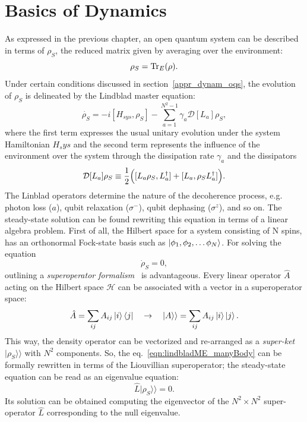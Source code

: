 \section{Basics of Dynamics}
As expressed in the previous chapter, an open quantum system can be described in terms of $\rho_S$, the reduced matrix given by averaging over the environment: 
\begin{equation}
    \rho_S = \operatorname{Tr}_E(\rho).
\end{equation}
Under certain conditions discussed in section~\ref{appr_dynam_oqs}, the evolution of $\rho_S$ is delineated by the Lindblad master equation:
\begin{equation}
\label{eqn:lindbladME_manyBody}
    \dot{\rho_S} = -i[H_{sys}, \rho_S] - \sum_{a=1}^{N^2-1} \gamma_a\mathcal{D}[L_a]\rho_S,
\end{equation}
where the first term expresses the usual unitary evolution under the system Hamiltonian $H_sys$ and the second term represents the influence of the environment over the system through the dissipation rate $\gamma_a$ and the dissipators
\begin{equation*}
    \mathcal{D}[L_a]\rho_S \equiv \frac{1}{2} \Bigl( [L_a\rho_S, L_a^{\dagger}] + [L_a, \rho_S L_a^{\dagger}] \Bigl).
\end{equation*}
The Linblad operators determine the nature of the decoherence process, e.g. photon loss ($a$), qubit relaxation ($\sigma^-$), qubit dephasing ($\sigma^z$), and so on.
The steady-state solution can be found rewriting this equation in terms of a linear algebra problem. First of all, the Hilbert space for a system consisting of N spins, has an orthonormal Fock-state basis such as $\ket{\phi_1, \phi_2, \dots \phi_N}$.
For solving the equation
\begin{equation*}
    \dot{\rho}_S = 0,
\end{equation*}
outlining a \emph{superoperator formalism}~\cite{davRoss_wordpress} is advantageous. 
Every linear operator $\hat{A}$ acting on the Hilbert space $\mathcal{H}$ can be associated with a vector in a superoperator space:
\begin{equation*}
    \hat{A} = \sum_{ij} A_{ij} \ket{i}\bra{j} \quad \rightarrow \quad |A\rangle\rangle = \sum_{ij} A_{ij} \ket{i}\ket{j}.
\end{equation*}
This way, the density operator can be vectorized and re-arranged as a \emph{super-ket} $|\rho_S\rangle\rangle$ with $N^2$ components. So, the eq.~\ref{eqn:lindbladME_manyBody} can be formally rewritten in terms of the Liouvillian superoperator; the steady-state equation can be read as an eigenvalue equation:
\begin{equation}
\label{eqn:SS_masterEq}
    \hat{L}|\rho_S\rangle\rangle = 0.
\end{equation}
Its solution can be obtained computing the eigenvector of the $N^2 \times N^2$ super-operator $\hat{L}$ corresponding to the null eigenvalue.

